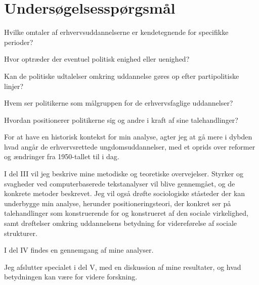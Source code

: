 \section{Undersøgelsesspørgsmål}\label{seq:resqs}

Hvilke omtaler af erhvervsuddannelserne er kendetegnende for specifikke perioder?

Hvor optræder der eventuel politisk enighed eller uenighed?

Kan de politiske udtalelser omkring uddannelse gøres op efter partipolitiske linjer?

Hvem ser politikerne som målgruppen for de erhvervsfaglige uddannelser?

Hvordan positionerer politikerne sig og andre i kraft af sine talehandlinger?


For at have en historisk kontekst for min analyse, agter jeg at gå mere i dybden hvad angår de erhvervsrettede ungdomsuddannelser, med et oprids over reformer og ændringer fra 1950-tallet til i dag.

I del III vil jeg beskrive mine metodiske og teoretiske overvejelser.
Styrker og svagheder ved computerbaserede tekstanalyser vil blive gennemgået, og de konkrete metoder beskrevet.
Jeg vil også drøfte sociologiske ståsteder der kan underbygge min analyse, herunder positioneringsteori, der konkret ser på talehandlinger som konstruerende for og konstrueret af den sociale virkelighed, samt drøftelser omkring uddannelsens betydning for videreførelse af sociale strukturer.

I del IV findes en gennemgang af mine analyser.

Jeg afslutter specialet i del V, med en diskussion af mine resultater, og hvad betydningen kan være for videre forskning.
